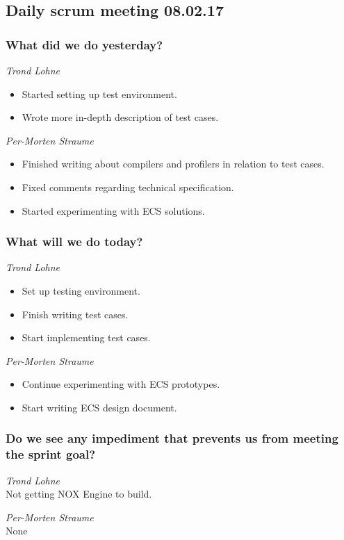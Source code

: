 \documentclass{article}
\begin{document}
\begin{center}
\subsection*{Daily scrum meeting 08.02.17}
\end{center}
\bigskip


\subsubsection*{What did we do yesterday?}

\noindent\textit{Trond Lohne}
\begin{itemize}
    \item
    Started setting up test environment.

    \item
    Wrote more in-depth description of test cases.

\end{itemize}

\medskip

\noindent\textit{Per-Morten Straume}
\begin{itemize}
    \item
    Finished writing about compilers and profilers in relation to test cases.

    \item
    Fixed comments regarding technical specification.

    \item
    Started experimenting with ECS solutions.
\end{itemize}


\subsubsection*{What will we do today?}

\noindent\textit{Trond Lohne}
\begin{itemize}
    \item
    Set up testing environment.

    \item
    Finish writing test cases.

    \item
    Start implementing test cases.
\end{itemize}

\medskip

\noindent\textit{Per-Morten Straume}
\begin{itemize}
    \item
    Continue experimenting with ECS prototypes.

    \item
    Start writing ECS design document.
\end{itemize}

\subsubsection*{Do we see any impediment that prevents us from meeting the sprint goal?}

\noindent\textit{Trond Lohne}\\
Not getting NOX Engine to build.

\medskip

\noindent\textit{Per-Morten Straume}\\
None
\end{document}
